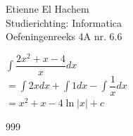 \documentclass[a4paper]{article}
\begin{document}
  
\noindent \large Etienne El Hachem \\
\noindent \large Studierichting: Informatica\\
\noindent \large Oefeningenreeks 4A nr. 6.6\\

\medskip

\normalsize

$\displaystyle\int \dfrac{2x^2 + x - 4}{x} dx$ \\

$= \displaystyle\int 2x dx + \displaystyle\int 1 dx - \displaystyle\int \dfrac{1}{x} dx$ \\

$= x^2 + x - 4 \ln |x| + c$



\begin{thebibliography}{999}
\end{thebibliography}
\end{document}
